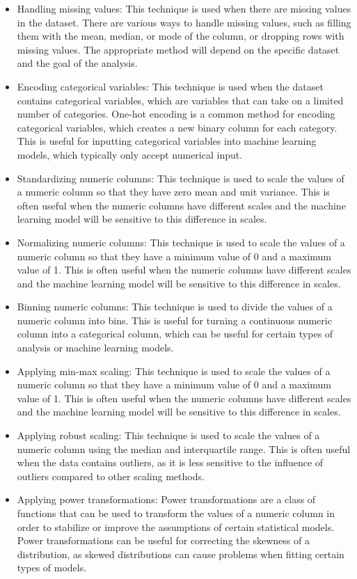\documentclass[11pt]{article}
\begin{document}
\begin{itemize} 
\item Handling missing values: This technique is used when there are missing values in the dataset. There are various ways to handle missing values, such as filling them with the mean, median, or mode of the column, or dropping rows with missing values. The appropriate method will depend on the specific dataset and the goal of the analysis.
\item Encoding categorical variables: This technique is used when the dataset contains categorical variables, which are variables that can take on a limited number of categories. One-hot encoding is a common method for encoding categorical variables, which creates a new binary column for each category. This is useful for inputting categorical variables into machine learning models, which typically only accept numerical input.
\item Standardizing numeric columns: This technique is used to scale the values of a numeric column so that they have zero mean and unit variance. This is often useful when the numeric columns have different scales and the machine learning model will be sensitive to this difference in scales.
\item Normalizing numeric columns: This technique is used to scale the values of a numeric column so that they have a minimum value of 0 and a maximum value of 1. This is often useful when the numeric columns have different scales and the machine learning model will be sensitive to this difference in scales.
\item Binning numeric columns: This technique is used to divide the values of a numeric column into bins. This is useful for turning a continuous numeric column into a categorical column, which can be useful for certain types of analysis or machine learning models.
\item Applying min-max scaling: This technique is used to scale the values of a numeric column so that they have a minimum value of 0 and a maximum value of 1. This is often useful when the numeric columns have different scales and the machine learning model will be sensitive to this difference in scales.
\item Applying robust scaling: This technique is used to scale the values of a numeric column using the median and interquartile range. This is often useful when the data contains outliers, as it is less sensitive to the influence of outliers compared to other scaling methods.
\item Applying power transformations: Power transformations are a class of functions that can be used to transform the values of a numeric column in order to stabilize or improve the assumptions of certain statistical models. Power transformations can be useful for correcting the skewness of a distribution, as skewed distributions can cause problems when fitting certain types of models.

\end{itemize}
\end{document}
